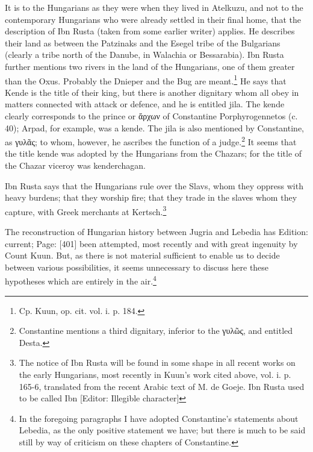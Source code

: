 It is to the Hungarians as they were when they lived in Atelkuzu, and not to the contemporary Hungarians who were already settled in their final home, that the description of Ibn Rusta (taken from some earlier writer) applies. He describes their land as between the Patzinaks and the Esegel tribe of the Bulgarians (clearly a tribe north of the Danube, in Walachia or Bessarabia). Ibn Rusta further mentions two rivers in the land of the Hungarians, one of them greater than the Oxus. Probably the Dnieper and the Bug are meant.\footnote{Cp. Kuun, op. cit. vol. i. p. 184.} He says that Kende is the title of their king, but there is another dignitary whom all obey in matters connected with attack or defence, and he is entitled jila. The kende clearly corresponds to the prince or \textgreek{\texthebrew{ἄ}ρχων} of Constantine Porphyrogennetos (c. 40); Arpad, for example, was a kende. The jila is also mentioned by Constantine, as \textgreek{γυλ\texthebrew{ᾶ}ς}; to whom, however, he ascribes the function of a judge.\footnote{Constantine mentions a third dignitary, inferior to the \textgreek{γυλ\texthebrew{ῶ}ς}, and entitled Desta.} It seems that the title kende was adopted by the Hungarians from the Chazars; for the title of the Chazar viceroy was kenderchagan.

Ibn Rusta says that the Hungarians rule over the Slavs, whom they oppress with heavy burdens; that they worship fire; that they trade in the slaves whom they capture, with Greek merchants at Kertsch.\footnote{The notice of Ibn Rusta will be found in some shape in all recent works on the early Hungarians, most recently in Kuun\texthebrew{}’s work cited above, vol. i. p. 165-6, translated from the recent Arabic text of M. de Goeje. Ibn Rusta used to be called Ibn [Editor: Illegible character]}

The reconstruction of Hungarian history between Jugria and Lebedia has Edition: current; Page: [401] been attempted, most recently and with great ingenuity by Count Kuun. But, as there is not material sufficient to enable us to decide between various possibilities, it seems unnecessary to discuss here these hypotheses which are entirely in the air.\footnote{In the foregoing paragraphs I have adopted Constantine\texthebrew{}’s statements about Lebedia, as the only positive statement we have; but there is much to be said still by way of criticism on these chapters of Constantine.}

